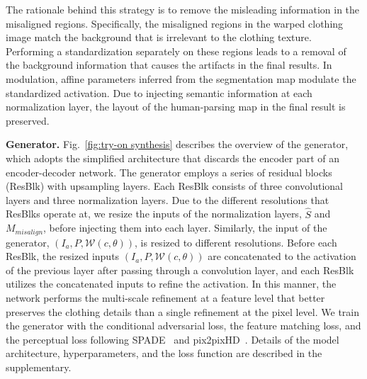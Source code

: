 The rationale behind this strategy is to remove the misleading information in the misaligned regions.
Specifically, the misaligned regions in the warped clothing image match the background that is irrelevant to the clothing texture.
Performing a standardization separately on these regions leads to a removal of the background information that causes the artifacts in the final results.
In modulation, affine parameters inferred from the segmentation map modulate the standardized activation.
Due to injecting semantic information at each \norm normalization layer, the layout of the human-parsing map in the final result is preserved.

\textbf{\norm Generator.}
Fig.~\ref{fig:try-on synthesis} describes the overview of the \norm generator, which adopts the simplified architecture that discards the encoder part of an encoder-decoder network.
The generator employs a series of residual blocks (ResBlk) with upsampling layers.
Each \norm ResBlk consists of three convolutional layers and three \norm normalization layers. 
Due to the different resolutions that ResBlks operate at, we resize the inputs of the normalization layers, $\hat{S}$ and $M_{misalign}$, before injecting them into each layer.
Similarly, the input of the generator, $(I_a, P, \mathcal{W}(c, \theta))$, is resized to different resolutions.
Before each ResBlk, the resized inputs $(I_a, P, \mathcal{W}(c, \theta))$ are concatenated to the activation of the previous layer after passing through a convolution layer, and each ResBlk utilizes the concatenated inputs to refine the activation.
In this manner, the network performs the multi-scale refinement at a feature level that better preserves the clothing details than a single refinement at the pixel level.
We train the \norm generator with the conditional adversarial loss, the feature matching loss, and the perceptual loss following SPADE~\cite{park2019semantic} and pix2pixHD~\cite{wang2018high}.
Details of the model architecture, hyperparameters, and the loss function are described in the supplementary.
